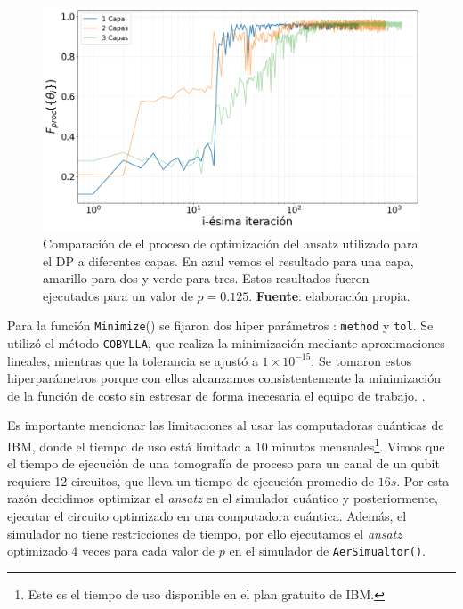 \documentclass[letterpaper,12pt]{thesisECFM}
\theoremstyle{plain}
\theoremstyle{definition}
\theoremstyle{remark}
\newcommand{\1}{\mathbb{1}}
\begin{document}
\begin{figure}[h!] 
    \centering 
    \includegraphics[width=0.70 \linewidth]{imagenes/comparacion_capas.png}
    \caption{Comparación de el proceso de optimización del ansatz utilizado para el DP a diferentes capas. En azul vemos el resultado para una capa, amarillo para dos y verde para tres. Estos resultados fueron ejecutados para un valor de $p=0.125$. \textbf{Fuente}: elaboración propia. }
    \label{fig:comparacion_capas}
\end{figure}


Para la función \texttt{Minimize}() se fijaron dos hiper parámetros : \texttt{method} y \texttt{tol}. Se utilizó el método \texttt{COBYLLA}, que realiza la minimización mediante aproximaciones lineales, mientras que la tolerancia se ajustó a $1\times 10^{-15}$. Se tomaron estos hiperparámetros porque con ellos alcanzamos consistentemente la minimización de la función de costo sin estresar de forma inecesaria el equipo de trabajo.  .


Es importante mencionar las limitaciones al usar las computadoras cuánticas de
IBM, donde el tiempo de uso está limitado a 10 minutos mensuales\footnote{Este
es el tiempo de uso disponible en el plan gratuito de IBM.}. Vimos que el
tiempo de ejecución de una tomografía de proceso para un canal de un  qubit
 
requiere 12 circuitos, que lleva un tiempo de ejecución promedio de $16s$. Por
esta razón decidimos optimizar el \textit{ansatz} en el simulador cuántico y
posteriormente, ejecutar el circuito optimizado en una computadora cuántica.
Además, el simulador no tiene restricciones de tiempo, por ello ejecutamos el
\textit{ansatz} optimizado 4 veces para cada valor de $p$ en el simulador de
\texttt{AerSimualtor()}.
\end{document}
